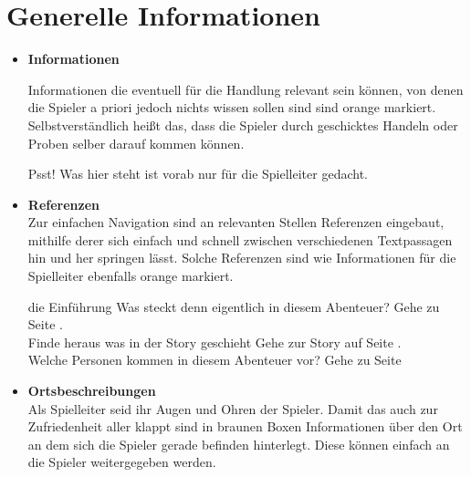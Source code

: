 
\thispagestyle{fancy-info}
\section*{Generelle Informationen}

\begin{itemize}
  \item \textcolor{OrangeBoxFrame}{\textbf{Informationen}}

  Informationen die eventuell für die Handlung relevant sein können, von denen die Spieler a priori jedoch nichts wissen sollen sind sind \textcolor{OrangeBoxFrame}{orange}
  markiert. Selbstverständlich heißt das, dass die Spieler durch geschicktes Handeln oder Proben selber darauf kommen können.

  \begin{info-box}

  Psst! Was hier steht ist vorab nur für die Spielleiter gedacht.

  \end{info-box}

  \item \textcolor{OrangeBoxFrame}{\textbf{Referenzen}} \\
  Zur einfachen Navigation sind an relevanten Stellen \textcolor{OrangeBoxFrame}{Referenzen} eingebaut, mithilfe derer sich einfach und
  schnell zwischen verschiedenen Textpassagen hin und her springen lässt. Solche Referenzen sind wie Informationen für die Spielleiter ebenfalls
  \textcolor{OrangeBoxFrame}{orange} markiert.

  \vspace{-5pt}
  \begin{ref-box}{die Einführung}
      Was steckt denn eigentlich in diesem Abenteuer? \then Gehe zu Seite . \\
      Finde heraus was in der Story geschieht \then Gehe zur Story auf Seite . \\
      Welche Personen kommen in diesem Abenteuer vor? \then Gehe zu Seite 
  \end{ref-box}
  \vspace{-5pt}

  \item \textcolor{BrownBoxFrame}{\textbf{Ortsbeschreibungen}} \\
  Als Spielleiter seid ihr Augen und Ohren der Spieler. Damit das auch zur Zufriedenheit aller klappt sind in \textcolor{BrownBoxFrame}{braunen}
  Boxen Informationen über den Ort an dem sich die Spieler gerade befinden hinterlegt. Diese können einfach an die Spieler weitergegeben werden.


\end{itemize}
